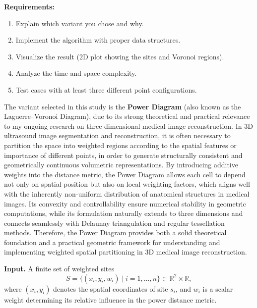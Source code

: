\documentclass{article}
\begin{document}
\noindent \textbf{Requirements:}
\begin{enumerate}
    \item Explain which variant you chose and why.
    \item Implement the algorithm with proper data structures.
    \item Visualize the result (2D plot showing the sites and Voronoi regions).
    \item Analyze the time and space complexity.
    \item Test cases with at least three different point configurations.
\end{enumerate}

\setcounter{Psec}{0}
\setcounter{Psubsec}{0}

\newpage


The variant selected in this study is the \textbf{Power Diagram} (also known as the Laguerre–Voronoi Diagram), due to its strong theoretical and practical relevance to my ongoing research on three-dimensional medical image reconstruction.  
In 3D ultrasound image segmentation and reconstruction, it is often necessary to partition the space into weighted regions according to the spatial features or importance of different points, in order to generate structurally consistent and geometrically continuous volumetric representations.  
By introducing additive weights into the distance metric, the Power Diagram allows each cell to depend not only on spatial position but also on local weighting factors, which aligns well with the inherently non-uniform distribution of anatomical structures in medical images.  
Its convexity and controllability ensure numerical stability in geometric computations, while its formulation naturally extends to three dimensions and connects seamlessly with Delaunay triangulation and regular tessellation methods.  
Therefore, the Power Diagram provides both a solid theoretical foundation and a practical geometric framework for understanding and implementing weighted spatial partitioning in 3D medical image reconstruction.


\textbf{Input.}  
A finite set of weighted sites
\[
S = \{(x_i, y_i, w_i) \mid i = 1, \dots, n\} \subset \mathbb{R}^2 \times \mathbb{R},
\]
where $(x_i, y_i)$ denotes the spatial coordinates of site $s_i$, and $w_i$ is a scalar weight determining its relative influence in the power distance metric.
\end{document}
